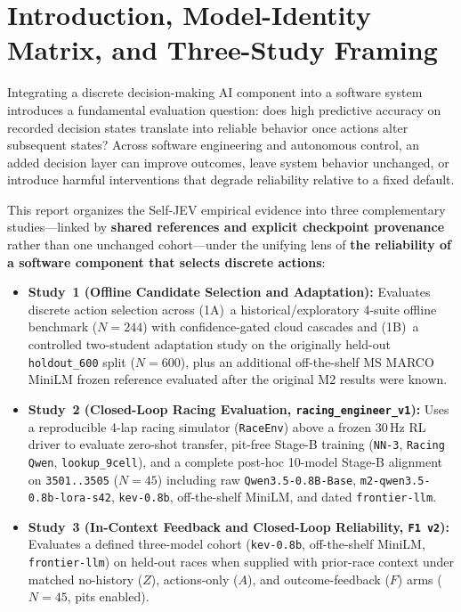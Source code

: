\documentclass[11pt,a4paper]{article}
\begin{document}
\section{Introduction, Model-Identity Matrix, and Three-Study Framing}

Integrating a discrete decision-making AI component into a software system introduces a fundamental evaluation question: does high predictive accuracy on recorded decision states translate into reliable behavior once actions alter subsequent states? Across software engineering and autonomous control, an added decision layer can improve outcomes, leave system behavior unchanged, or introduce harmful interventions that degrade reliability relative to a fixed default.

This report organizes the Self-JEV empirical evidence into three complementary studies---linked by \textbf{shared references and explicit checkpoint provenance} rather than one unchanged cohort---under the unifying lens of \textbf{the reliability of a software component that selects discrete actions}:
\begin{itemize}[leftmargin=1.5em,itemsep=2pt]
  \item \textbf{Study~1 (Offline Candidate Selection and Adaptation):} Evaluates discrete action selection across (1A)~a historical/exploratory 4-suite offline benchmark ($N=244$) with confidence-gated cloud cascades and (1B)~a controlled two-student adaptation study on the originally held-out \texttt{holdout\_600} split ($N=600$), plus an additional off-the-shelf MS MARCO MiniLM frozen reference evaluated after the original M2 results were known.
  \item \textbf{Study~2 (Closed-Loop Racing Evaluation, \texttt{racing\_engineer\_v1}):} Uses a reproducible 4-lap racing simulator (\texttt{RaceEnv}) above a frozen 30\,Hz RL driver to evaluate zero-shot transfer, pit-free Stage-B training (\texttt{NN-3}, \texttt{Racing Qwen}, \texttt{lookup\_9cell}), and a complete post-hoc 10-model Stage-B alignment on \texttt{3501..3505} ($N=45$) including raw \texttt{Qwen3.5-0.8B-Base}, \texttt{m2-qwen3.5-0.8b-lora-s42}, \texttt{kev-0.8b}, off-the-shelf MiniLM, and dated \texttt{frontier-llm}.
  \item \textbf{Study~3 (In-Context Feedback and Closed-Loop Reliability, \texttt{F1 v2}):} Evaluates a defined three-model cohort (\texttt{kev-0.8b}, off-the-shelf MiniLM, \texttt{frontier-llm}) on held-out races when supplied with prior-race context under matched no-history ($Z$), actions-only ($A$), and outcome-feedback ($F$) arms ($N=45$, pits enabled).
\end{itemize}
\end{document}
